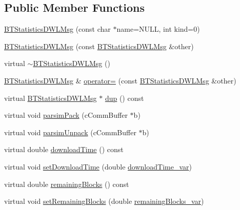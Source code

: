 \subsection*{Public Member Functions}
\begin{DoxyCompactItemize}
\item 
\hyperlink{classBTStatisticsDWLMsg_aaa3666e7e5a800b20de90f2542b983ac}{B\+T\+Statistics\+D\+W\+L\+Msg} (const char $\ast$name=N\+U\+L\+L, int kind=0)
\item 
\hyperlink{classBTStatisticsDWLMsg_a1821f638c1037c06bfe6a844e903529b}{B\+T\+Statistics\+D\+W\+L\+Msg} (const \hyperlink{classBTStatisticsDWLMsg}{B\+T\+Statistics\+D\+W\+L\+Msg} \&other)
\item 
virtual \hyperlink{classBTStatisticsDWLMsg_aa6aa172862b6736d1165e7eb66373b87}{$\sim$\+B\+T\+Statistics\+D\+W\+L\+Msg} ()
\item 
\hyperlink{classBTStatisticsDWLMsg}{B\+T\+Statistics\+D\+W\+L\+Msg} \& \hyperlink{classBTStatisticsDWLMsg_a24e5ad7f6f829c8f84a8f408ddcffd36}{operator=} (const \hyperlink{classBTStatisticsDWLMsg}{B\+T\+Statistics\+D\+W\+L\+Msg} \&other)
\item 
virtual \hyperlink{classBTStatisticsDWLMsg}{B\+T\+Statistics\+D\+W\+L\+Msg} $\ast$ \hyperlink{classBTStatisticsDWLMsg_a346f1b869175fd19ea9993e5a91c53ff}{dup} () const 
\item 
virtual void \hyperlink{classBTStatisticsDWLMsg_a98c50fae916eb7a3896e6dc80c128daa}{parsim\+Pack} (c\+Comm\+Buffer $\ast$b)
\item 
virtual void \hyperlink{classBTStatisticsDWLMsg_a1c593fc8c67a786f0ddae3e39c11a72b}{parsim\+Unpack} (c\+Comm\+Buffer $\ast$b)
\item 
virtual double \hyperlink{classBTStatisticsDWLMsg_a4679c88bdf679797db3a84752849fb3e}{download\+Time} () const 
\item 
virtual void \hyperlink{classBTStatisticsDWLMsg_abf6d8570e06fab2b11e5a7486e32fb0c}{set\+Download\+Time} (double \hyperlink{classBTStatisticsDWLMsg_aac2d1b785397639eda222a1ca199c9b9}{download\+Time\+\_\+var})
\item 
virtual double \hyperlink{classBTStatisticsDWLMsg_a1945242a8136c7e5f153dc5202226572}{remaining\+Blocks} () const 
\item 
virtual void \hyperlink{classBTStatisticsDWLMsg_a5786113156e5ed923d012bd4f87d43fe}{set\+Remaining\+Blocks} (double \hyperlink{classBTStatisticsDWLMsg_a75864f08a2c20984746ee75831c0732c}{remaining\+Blocks\+\_\+var})
\end{DoxyCompactItemize}
